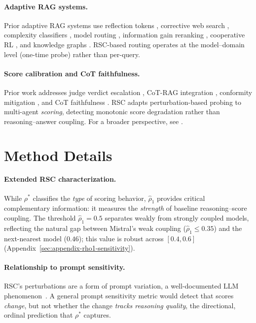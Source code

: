 \documentclass[11pt]{article}
\theoremstyle{definition}
\begin{document}
\paragraph{Adaptive RAG systems.}
Prior adaptive RAG systems use reflection tokens \citep{asai2024self}, corrective web search \citep{yan2024corrective}, complexity classifiers \citep{jeong2024adaptive}, model routing \citep{ong2024routellm}, information gain reranking \citep{wang2025infogain}, cooperative RL \citep{chen2025improving}, and knowledge graphs \citep{liu2025truthfulrag,xu2024knowledge}. RSC-based routing operates at the model--domain level (one-time probe) rather than per-query.

\paragraph{Score calibration and CoT faithfulness.}
Prior work addresses judge verdict escalation \citep{jung2024trust}, CoT-RAG integration \citep{li2025cot}, conformity mitigation \citep{pitre2025consensagent}, and CoT faithfulness \citep{turpin2023language,lanham2023measuring,tutek2025measuring,lyu2023faithful,tanneru2024hardness,paul2024making}. RSC adapts perturbation-based probing to multi-agent \emph{scoring}, detecting monotonic score degradation rather than reasoning--answer coupling. For a broader perspective, see \citet{li2025generation}.


\section{Method Details}
\label{sec:appendix-method-details}

\paragraph{Extended RSC characterization.}
While \(\rho^*\) classifies the \emph{type} of scoring behavior, \(\hat{\rho}_1\) provides critical
complementary information: it measures the \emph{strength} of baseline
reasoning--score coupling.
The threshold \(\hat{\rho}_1 = 0.5\) separates weakly from strongly
coupled models, reflecting the natural gap between Mistral's weak coupling
(\(\hat{\rho}_1 \leq 0.35\)) and the next-nearest model (\(0.46\));
this value is robust across \([0.4, 0.6]\)
(Appendix~\ref{sec:appendix-rho1-sensitivity}).

\paragraph{Relationship to prompt sensitivity.}
RSC's perturbations are a form of prompt variation, a well-documented LLM
phenomenon~\citep{sclar2023quantifying, webson2022prompt}.
A general prompt sensitivity metric would detect that scores \emph{change},
but not whether the change \emph{tracks reasoning quality}, the directional,
ordinal prediction that \(\rho^*\) captures.
\end{document}

